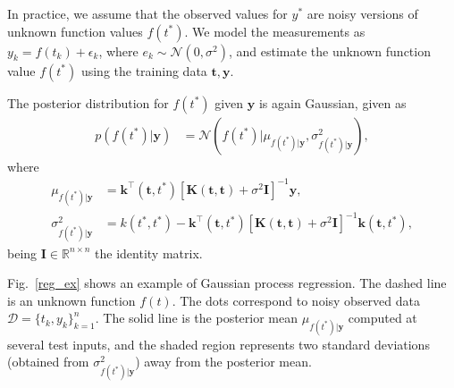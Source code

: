 \documentclass[journal]{IEEEtran}
\begin{document}
In practice, we assume that the observed values for $y^*$ are noisy versions of unknown function values $f(t^*)$.
We model the measurements as $y_k = f(t_k) + \epsilon_k$, where $e_k\sim \mathcal{N}(0, \sigma^2)$, and estimate
the unknown function value $f(t^*)$ using the training data $\mathbf{t}, \mathbf{y}$.

The posterior distribution for $f(t^*)$ given $\mathbf{y}$ is again Gaussian, given as
\begin{align*}
p(f(t^*)|\mathbf{y}) & =\mathcal{N}(f(t^*)|\mu_{f(t^*)|\mathbf{y}}, \sigma^2_{f(t^*)|\mathbf{y}}),
\end{align*}
where
\begin{align*}
\mu_{f(t^*)|\mathbf{y}} & = \mathbf{k}^{\top}(\mathbf{t}, t^*)\left[\mathbf{K}(\mathbf{t}, \mathbf{t}) +
\sigma^2\mathbf{I}\right]^{-1}\mathbf{y},\\
\sigma^2_{f(t^*)|\mathbf{y}} & = k(t^*, t^*) - \mathbf{k}^{\top}(\mathbf{t}, t^*)\left[\mathbf{K}(\mathbf{t}, \mathbf{t}) +
\sigma^2\mathbf{I}\right]^{-1}\mathbf{k}(\mathbf{t}, t^*),
\end{align*}
being $\mathbf{I}\in\mathbb{R}^{n\times n}$ the identity matrix.

Fig.~\ref{reg_ex} shows an example of Gaussian process regression. The dashed line is an unknown function $f(t)$. The
dots correspond to noisy observed data $\mathcal{D} = \{t_k,y_k\}_{k=1}^n$. The solid line is the posterior mean
$\mu_{f(t^*)|\mathbf{y}}$ computed at several test inputs, and the shaded region represents two standard deviations
(obtained from $\sigma^2_{f(t^*)|\mathbf{y}}$) away from the posterior mean.
\end{document}

